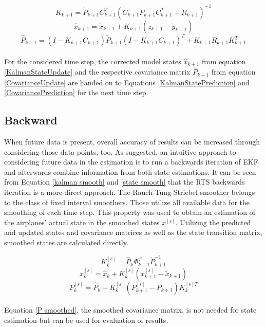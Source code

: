 \begin{equation}
K_{k+1} = \widetilde{P}_{k+1}C_{k+1}^T (C_{k+1}\widetilde{P}_{k+1}C_{k+1}^T + R_{k+1})^{-1} \label{KalmanGain}
\end{equation}
\begin{equation}
\widehat{x} _{k+1} = \widetilde{x} _{k+1} + K_{k+1}(z_{k+1} - \widetilde{y}_{k+1}) \label{KalmanStateUpdate}
\end{equation}
\begin{equation}
\widehat{P} _{k+1} = (I - K_{k+1}C_{k+1})\widetilde{P}_{k+1}(I - K_{k+1}C_{k+1})^T + K_{k+1}R_{k+1}K_{k+1}^T \label{CovarianceUpdate}
\end{equation}\\
For the considered time step, the corrected model states $\widehat{x} _{k+1}$ from equation \ref{KalmanStateUpdate} and the respective covariance matrix $ \widehat{P}_{k+1} $ from equation \ref{CovarianceUpdate} are handed on to Equations \ref{KalmanStatePrediction} and \ref{CovariancePrediction} for the next time step. \newline

\subsection{Backward}
When future data is present, overall accuracy of results can be increased through considering those data points, too. As \cite{JS_SA} suggested, an intuitive approach to considering future data in the estimation is to run a backwards iteration of EKF and afterwards combine information from both state estimations. It can be seen from Equation \ref{kalman smooth} and \ref{state smooth} that the RTS backwards iteration is a more direct approach. The Rauch-Tung-Striebel smoother belongs to the class of fixed interval smoothers. Those utilize all available data for the smoothing of each time step. This property was used to obtain an estimation of the airplanes' actual state in the smoothed states $x^{[s]}$. \cite{RTS_application}  Utilizing the predicted and updated states and covariance matrices as well as the state transition matrix, smoothed states are calculated directly.

\begin{equation}
K_{k}^{[s]} = \widehat{P}_{k}\Phi_{k+1}^T\widetilde{P}_{k+1}^{-1} \label{kalman smooth}
\end{equation}
\begin{equation}
{x} _{k}^{[s]} = \widehat{x} _{k} + K_{k}^{[s]}({x} _{k+1}^{[s]} - \widetilde{x}_{k+1}) \label{state smooth}
\end{equation}
\begin{equation}
P_{k}^{[s]} = \widehat{P}_{k} + K_{k}^{[s]}(P_{k+1}^{[s]} - \widetilde{P}_{k+1})K_{k}^{[s]T}\label{P smoothed}
\end{equation}\\

Equation \ref{P smoothed}, the smoothed covariance matrix, is not needed for state estimation but can be used for evaluation of results.
